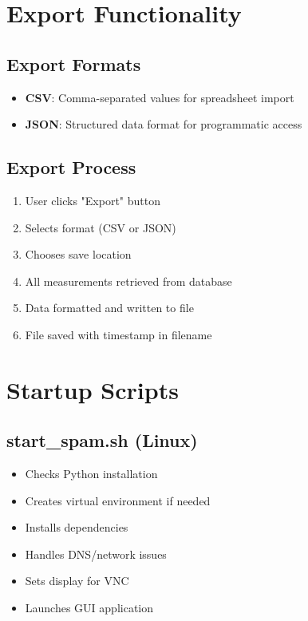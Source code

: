 \documentclass[11pt,a4paper]{article}
\begin{document}
\section{Export Functionality}

\subsection{Export Formats}
\begin{itemize}
    \item \textbf{CSV}: Comma-separated values for spreadsheet import
    \item \textbf{JSON}: Structured data format for programmatic access
\end{itemize}

\subsection{Export Process}
\begin{enumerate}
    \item User clicks "Export" button
    \item Selects format (CSV or JSON)
    \item Chooses save location
    \item All measurements retrieved from database
    \item Data formatted and written to file
    \item File saved with timestamp in filename
\end{enumerate}

\section{Startup Scripts}

\subsection{start\_spam.sh (Linux)}
\begin{itemize}
    \item Checks Python installation
    \item Creates virtual environment if needed
    \item Installs dependencies
    \item Handles DNS/network issues
    \item Sets display for VNC
    \item Launches GUI application
\end{itemize}
\end{document}
